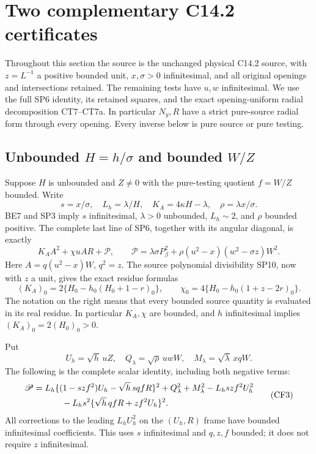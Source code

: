 \section{Two complementary C14.2 certificates}
\label{sec:r19-c142-complements}

Throughout this section the source is the unchanged physical C14.2
source, with $z=L^{-1}$ a positive bounded unit, $x,\sigma>0$
infinitesimal, and all original openings and intersections retained.
The remaining tests have $u,w$ infinitesimal. We use the full SP6
identity, its retained squares, and the exact opening-uniform radial
decomposition CT7--CT7a. In particular $N_y,R$ have a strict
pure-source radial form through every opening. Every inverse below is
pure source or pure testing.

\subsection{Unbounded $H=h/\sigma$ and bounded $W/Z$}

Suppose $H$ is unbounded and $Z\ne0$ with the pure-testing quotient
$f=W/Z$ bounded. Write
\[
 s=x/\sigma,\quad L_h=\lambda/H,\quad
 K_A=4\kappa H-\lambda,\quad \rho=\lambda x/\sigma.
\]
BE7 and SP3 imply $s$ infinitesimal, $\lambda>0$ unbounded,
$L_h\sim2$, and $\rho$ bounded positive. The complete last line of
SP6, together with its angular diagonal, is exactly
\[
 K_A A^2+\chi uAR+\mathscr P,\qquad
 \mathscr P=\lambda\sigma P_\beta^2
       +\rho(u^2-x)(w^2-\sigma z)W^2.                 \tag{CF1}
\]
Here $A=q(u^2-x)W$, $q^2=z$. The source polynomial divisibility
SP10, now with $z$ a unit, gives the exact residue formulas
\[
 (K_A)_0=2\{H_0-h_0(H_0+1-r)_0\},\qquad
 \chi_0=4\{H_0-h_0(1+z-2r)_0\}.                    \tag{CF2}
\]
The notation on the right means that every bounded source quantity
is evaluated in its real residue. In particular $K_A,\chi$ are
bounded, and $h$ infinitesimal implies $(K_A)_0=2(H_0)_0>0$.

Put
\[
 U_h=\sqrt h\,uZ,\quad Q_\lambda=\sqrt\rho\,uwW,
 \quad M_\lambda=\sqrt\lambda\,xqW.
\]
The following is the complete scalar identity, including both
negative terms:
\[
\begin{split}
 \mathscr P={}&L_h\{(1-szf^2)U_h-\sqrt h\,sqfR\}^2
       +Q_\lambda^2+M_\lambda^2-L_hszf^2U_h^2\\
 &\hspace{7mm}-L_hs^2\{\sqrt h\,qfR+zf^2U_h\}^2.
\end{split}                                                   \tag{CF3}
\]
All corrections to the leading $L_hU_h^2$ on the $(U_h,R)$
frame have bounded infinitesimal coefficients. This uses $s$ infinitesimal
and $q,z,f$ bounded; it does not require $z$ infinitesimal.

